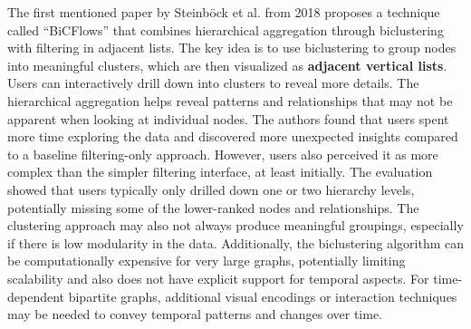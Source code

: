\documentclass{vgtc}
\begin{document}

\medskip

The first mentioned paper by Steinböck et al. from 2018 \cite{Steinbck2018CasualVE} proposes a technique called ``BiCFlows'' that combines hierarchical aggregation through biclustering with filtering in adjacent lists. The key idea is to use biclustering to group nodes into meaningful clusters, which are then visualized as \textbf{adjacent vertical lists}. Users can interactively drill down into clusters to reveal more details. The hierarchical aggregation helps reveal patterns and relationships that may not be apparent when looking at individual nodes. The authors found that users spent more time exploring the data and discovered more unexpected insights compared to a baseline filtering-only approach. However, users also perceived it as more complex than the simpler filtering interface, at least initially. The evaluation showed that users typically only drilled down one or two hierarchy levels, potentially missing some of the lower-ranked nodes and relationships. The clustering approach may also not always produce meaningful groupings, especially if there is low modularity in the data. Additionally, the biclustering algorithm can be computationally expensive for very large graphs, potentially limiting scalability and also does not have explicit support for temporal aspects. For time-dependent bipartite graphs, additional visual encodings or interaction techniques may be needed to convey temporal patterns and changes over time.

\medskip
\end{document}
